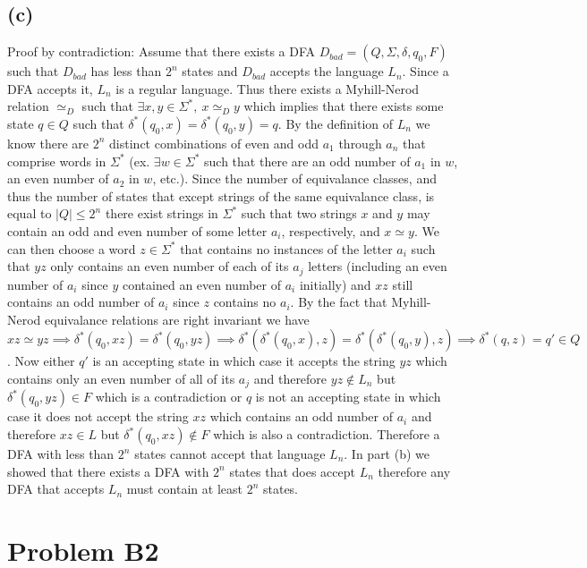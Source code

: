 \documentclass[12pt]{article}
\begin{document}
\subsection*{(c)}
Proof by contradiction:\newline
\indent Assume that there exists a DFA $D_{bad} = (Q, \Sigma, \delta, q_0, F)$
such that $D_{bad}$ has less than $2^n$ states and $D_{bad}$ accepts the
language $L_n$. Since a DFA accepts it, $L_n$ is a regular language. Thus
there exists a Myhill-Nerod relation $\simeq_D$ such that
$\exists x,y \in \Sigma^* ,\: x \simeq_D y$ which implies that there
exists some state $q \in Q$ such that $\delta^* (q_0, x)=\delta^* (q_0, y)=q$.
By the definition of $L_n$ we know there are $2^n$ distinct combinations of
even and odd $a_1$ through $a_n$ that comprise words in $\Sigma^*$
(ex. $\exists w \in \Sigma^*$ such that there are an odd number of $a_1$
in $w$, an even number of $a_2$ in $w$, etc.). Since the number of equivalance
classes, and thus the number of states that except strings of the same
equivalance class, is equal to $|Q| \le 2^n$ there exist strings in $\Sigma^*$
such that two strings $x$ and $y$ may contain an odd and even number of
some letter $a_i$, respectively, and $x \simeq y$. We can then choose a word
$z \in \Sigma^*$ that contains no instances of the letter $a_i$ such that
$yz$ only contains an even number of each of its $a_j$ letters (including
an even number of $a_i$ since $y$ contained an even number of $a_i$ initially)
and $xz$ still contains an odd number of $a_i$ since $z$ contains no $a_i$.
By the fact that Myhill-Nerod equivalance relations are right invariant we have
$xz \simeq yz \implies \delta^* (q_0, xz) = \delta^* (q_0, yz) \implies
\delta^*(\delta^*(q_0, x), z) = \delta^*(\delta^*(q_0, y), z) \implies
\delta^*(q, z) = q' \in Q$. Now either $q'$ is an accepting state in which case
it accepts the string $yz$ which contains only an even number of all of its
$a_j$ and therefore $yz \notin L_n$ but $\delta^* (q_0, yz) \in F$ which is a
contradiction or $q$ is not an accepting state in which case it does not accept
the string $xz$ which contains an odd number of $a_i$ and therefore
$xz \in L$ but $\delta^* (q_0, xz) \notin F$ which is also a contradiction.
Therefore a DFA with less than $2^n$ states cannot accept that language $L_n$.
In part (b) we showed that there exists a DFA with $2^n$ states that does
accept $L_n$ therefore any DFA that accepts $L_n$ must contain at least
$2^n$ states.

\newpage
\section*{Problem B2}
\end{document}
